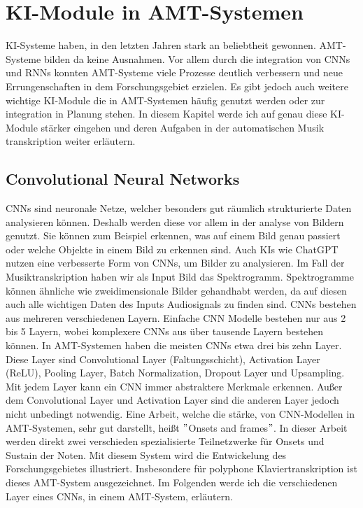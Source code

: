 \section{KI-Module in AMT-Systemen}
\label{sec:ki_integration}
KI-Systeme haben, in den letzten Jahren stark an beliebtheit gewonnen.
AMT-Systeme bilden da keine Ausnahmen.
Vor allem durch die integration von CNNs und RNNs konnten AMT-Systeme viele Prozesse deutlich verbessern
und neue Errungenschaften in dem Forschungsgebiet erzielen.
Es gibt jedoch auch weitere wichtige KI-Module die in AMT-Systemen häufig genutzt werden
oder zur integration in Planung stehen.
In diesem Kapitel werde ich auf genau diese KI-Module stärker eingehen
und deren Aufgaben in der automatischen Musik transkription weiter erläutern.

\subsection{Convolutional Neural Networks}
CNNs sind neuronale Netze, welcher besonders gut räumlich strukturierte Daten analysieren können.
Deshalb werden diese vor allem in der analyse von Bildern genutzt.
Sie können zum Beispiel erkennen, was auf einem Bild genau passiert oder welche Objekte in einem Bild zu erkennen sind.
Auch KIs wie ChatGPT nutzen eine verbesserte Form von CNNs, um Bilder zu analysieren.
Im Fall der Musiktranskription haben wir als Input Bild das Spektrogramm.
Spektrogramme können ähnliche wie zweidimensionale Bilder gehandhabt werden,
da auf diesen auch alle wichtigen Daten des Inputs Audiosignals zu finden sind.
CNNs bestehen aus mehreren verschiedenen Layern.
Einfache CNN Modelle bestehen nur aus 2 bis 5 Layern,
wobei komplexere CNNs aus über tausende Layern bestehen können.
In AMT-Systemen haben die meisten CNNs etwa drei bis zehn Layer.
Diese Layer sind Convolutional Layer (Faltungsschicht), Activation Layer (ReLU), Pooling Layer,
Batch Normalization, Dropout Layer und Upsampling.
Mit jedem Layer kann ein CNN immer abstraktere Merkmale erkennen.
Außer dem Convolutional Layer und Activation Layer sind die anderen Layer jedoch nicht unbedingt notwendig.
Eine Arbeit, welche die stärke, von CNN-Modellen in AMT-Systemen, sehr gut darstellt, heißt \("\)Onsets and frames\("\).
\cite{hawthorne2017onsets}
In dieser Arbeit werden direkt zwei verschieden spezialisierte Teilnetzwerke für Onsets und Sustain der Noten.
Mit diesem System wird die Entwickelung des Forschungsgebietes illustriert.
Insbesondere für polyphone Klaviertranskription ist dieses AMT-System ausgezeichnet.
Im Folgenden werde ich die verschiedenen Layer eines CNNs, in einem AMT-System, erläutern.

